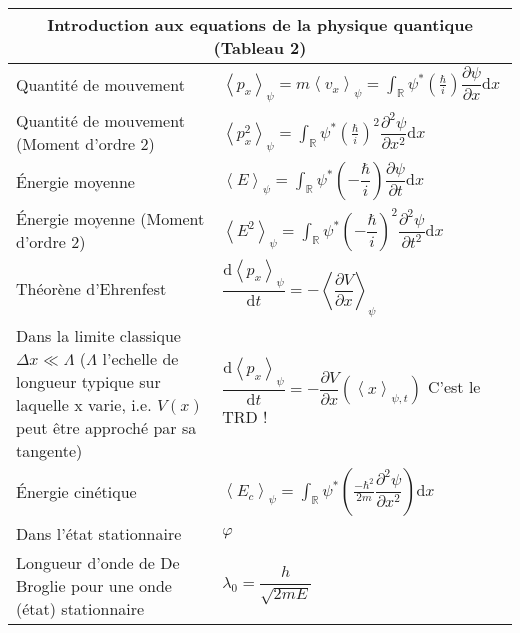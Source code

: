 \documentclass[10pt,a4paper,titlepage,landscape]{article}
\renewcommand{\d}
{
    \mathrm{d}
}
\newcommand*{\dv}[2]
{
    \dfrac{\d#1}{\d#2}
}
\newcommand*{\dpv}[2]
{
    \dfrac{\partial#1}{\partial#2}
}
\newcommand*{\ddpv}[2]
{
    \dfrac{\partial^2#1}{\partial{#2}^2}
}
\renewcommand{\arraystretch}{2}
\newcommand{\av}[2]
{
    \left\langle#1\right\rangle_{#2}
}
\newcommand{\rint}
{
    \int_{\mathbb{R}}
}
\begin{document}
\newpage 
\begin{table}[H]
    \centering
    \renewcommand{\arraystretch}{1.5} %
    \setlength{\tabcolsep}{8pt} %
    \begin{tabular}{@{}|p{9cm}|p{10cm}@{}|}

        \multicolumn{2}{c}{\textbf{Introduction aux equations de la physique quantique (Tableau 2)}} \\ \hline


    Quantité de mouvement & $\displaystyle \av{p_x}{\psi}=m\av{v_x}{\psi}=\rint \psi^* \left(\frac{\hbar}{i}\right) \dpv{\psi}{x}\d x$ \\ \hline 
    Quantité de mouvement (Moment d'ordre 2) & $\displaystyle \av{p_x^2}{\psi}=\rint \psi^* \left(\frac{\hbar}{i}\right)^2 \ddpv{\psi}{x}\d x$ \\ \hline
    Énergie moyenne & $\av{E}{\psi} = \rint \psi^* \left(-\dfrac{\hbar}{i}\right)\dpv{\psi}{t}\d x$ \\ \hline
    Énergie moyenne (Moment d'ordre 2) & $\av{E^2}{\psi} = \rint \psi^* \left(-\dfrac{\hbar}{i}\right)^2\ddpv{\psi}{t}\d x$ \\ \hline

    Théorène d'Ehrenfest & $\dv{\av{p_x}{\psi}}{t} = -\av{\dpv{V}{x}}{\psi}$ \\ \hline
    Dans la limite classique $\Delta x \ll \Lambda $ ($\Lambda$ l'echelle de longueur typique sur laquelle x varie, i.e. $V(x)$ peut être approché par sa tangente) & $\dv{\av{p_x}{\psi}}{t} = -\dpv{V}{x} \left(\av{x}{\psi, t}\right)$ C'est le TRD ! \\ \hline
    Énergie cinétique & $\displaystyle \av{E_c}{\psi} = \rint \psi^* \left(\frac{-\hbar^2}{2m}\ddpv{\psi}{x}\right) \d x $\\ \hline
    Dans l'état stationnaire & $\varphi $ \\ \hline
    Longueur d'onde de De Broglie pour une onde (état) stationnaire & $\lambda_0 = \dfrac{h}{\sqrt{2mE}}$ \\ \hline


\end{tabular}
\end{table}
\end{document}
